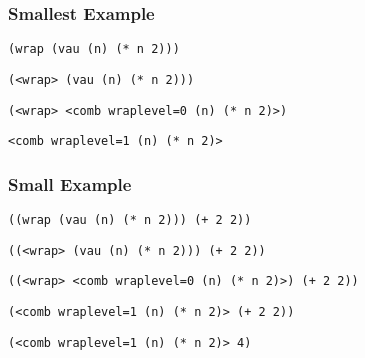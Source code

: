 \documentclass{beamer}
\begin{document}
\begin{frame}[fragile]
\frametitle{Smallest Example}
\footnotesize
\begin{verbatim}
(wrap (vau (n) (* n 2)))
\end{verbatim}
\end{frame}

\begin{frame}[fragile]
\footnotesize
\begin{verbatim}
(<wrap> (vau (n) (* n 2)))
\end{verbatim}
\end{frame}

\begin{frame}[fragile]
\footnotesize
\begin{verbatim}
(<wrap> <comb wraplevel=0 (n) (* n 2)>)
\end{verbatim}
\end{frame}

\begin{frame}[fragile]
\footnotesize
\begin{verbatim}
<comb wraplevel=1 (n) (* n 2)>
\end{verbatim}
\end{frame}

\begin{frame}[fragile]
\frametitle{Small Example}
\footnotesize
\begin{verbatim}
((wrap (vau (n) (* n 2))) (+ 2 2))
\end{verbatim}
\end{frame}

\begin{frame}[fragile]
\footnotesize
\begin{verbatim}
((<wrap> (vau (n) (* n 2))) (+ 2 2))
\end{verbatim}
\end{frame}

\begin{frame}[fragile]
\footnotesize
\begin{verbatim}
((<wrap> <comb wraplevel=0 (n) (* n 2)>) (+ 2 2))
\end{verbatim}
\end{frame}

\begin{frame}[fragile]
\footnotesize
\begin{verbatim}
(<comb wraplevel=1 (n) (* n 2)> (+ 2 2))
\end{verbatim}
\end{frame}

\begin{frame}[fragile]
\footnotesize
\begin{verbatim}
(<comb wraplevel=1 (n) (* n 2)> 4)
\end{verbatim}
\end{frame}
\end{document}
